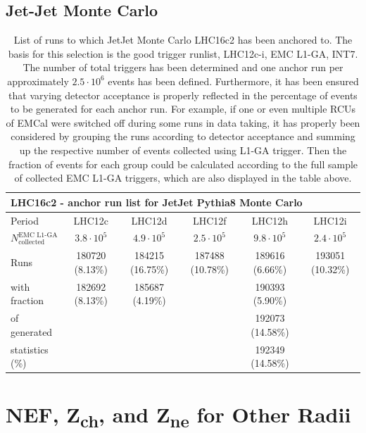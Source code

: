 \documentclass[ALICE]{ALICE_analysis_notes}
\begin{document}
\begin{appendix}
\newpage

\subsection{Jet-Jet Monte Carlo}	
\label{subsec:runsJJMC}
	
\begin{table}[h!]
	\hspace*{-0.2cm}
	\small
	\centering
	\begin{tabular}{lccccc}  
	    \toprule
		\multicolumn{6}{l}{\textbf{LHC16c2 - anchor run list for JetJet Pythia8 Monte Carlo}} \\ \midrule
		Period & LHC12c & LHC12d & LHC12f & LHC12h & LHC12i\\
		$N^{\text{EMC L1-GA}}_{\text{collected}}$ & $3.8 \cdot 10^{5}$ & $4.9 \cdot 10^{5}$ & $2.5 \cdot 10^{5}$ & $9.8 \cdot 10^{5}$ & $2.4 \cdot 10^{5}$\\ \midrule
		Runs 			 & 180720 (8.13\%) & 184215 (16.75\%) & 187488 (10.78\%) & 189616 (6.66\%) & 193051 (10.32\%) \\
		with fraction	 & 182692 (8.13\%) & 185687 (4.19\%) &  & 190393 (5.90\%) &  \\
		of generated	 &  &  &  & 192073 (14.58\%) &  \\
		statistics (\%)	 &  &  &  & 192349 (14.58\%) &  \\
		\bottomrule
	\end{tabular}
	\caption{List of runs to which JetJet Monte Carlo LHC16c2 has been anchored to. The basis for this selection is the good trigger runlist, LHC12c-i, EMC L1-GA, INT7. The number of total triggers has been determined and one anchor run per approximately $ 2.5 \cdot 10^{6}$ events has been defined. Furthermore, it has been ensured that varying detector acceptance is properly reflected in the percentage of events to be generated for each anchor run. For example, if one or even multiple RCUs of EMCal were switched off during some runs in data taking, it has properly been considered by grouping the runs according to detector acceptance and summing up the respective number of events collected using L1-GA trigger. Then the fraction of events for each group could be calculated according to the full sample of collected EMC L1-GA triggers, which are also displayed in the table above.}
	\label{tab:runsJetJet}
\end{table}

\newpage
	
\section{NEF, \texorpdfstring{Z\textsubscript{ch}}{Zch}, and \texorpdfstring{Z\textsubscript{ne}}{Zne} for Other Radii}
\label{sec:appendixTriggerBias}



\end{appendix}
\end{document}
